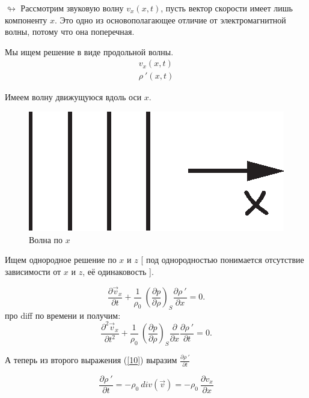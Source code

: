 \documentclass[14pt,a4paper,oneside]{extarticle}	%
\begin{document}
$ \looparrowright $
Рассмотрим звуковую волну $ v_{x}(x,t) $, пусть вектор скорости имеет лишь компоненту $ x $.
Это одно из основополагающее отличие от электромагнитной волны, потому что она поперечная.

Мы ищем решение в виде продольной волны.
\begin{eqnarray}
v_{x} (x,t) \\
\rho\:'(x,t)
\end{eqnarray}

Имеем волну движущуюся вдоль оси $ x $.

\begin{figure}[h!] 	%
	\centering 		%
	\includegraphics{1.eps} %
	\caption{Волна по $ x $}
	\label{fig::1}
\end{figure}

Ищем однородное решение по $ x $ и $ z $
[ под однородностью понимается отсутствие зависимости от $ x $ и $ z $, её одинаковость ].

\begin{equation}\label{11}
\frac{\partial \vec{v}_{x}}{\partial t} + \frac{1}{\rho_{0}}\:\left( \frac{\partial p}{\partial \rho} \right)_{S} \frac{\partial\rho\:'}{\partial x} = 0.
\end{equation}
про diff по времени и получим:
\begin{equation}\label{12}
\frac{\partial^{2} \vec{v}_{x}}{\partial t^{2}} + \frac{1}{\rho_{0}}\:\left( \frac{\partial p}{\partial \rho} \right)_{S} \frac{\partial}{\partial x}\frac{\partial\rho\:'}{\partial t} = 0.
\end{equation}

А теперь из второго выражения (\ref{10}) выразим $ \frac{\partial \rho \: '}{\partial t} $

\begin{equation}\label{13}
\frac{\partial \rho\:'}{\partial t} = - \rho_{0}\: div(\vec{v}) = - \rho_{0}\: \frac{\partial v_{x}}{\partial x}
\end{equation}
\end{document}
